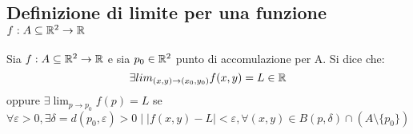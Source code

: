 \subsection{Definizione di limite per una funzione $f: A \subseteq \mathbb{R}^2 \to \mathbb{R}$}
\begin{definition}
  Sia $f: A \subseteq \mathbb{R}^2 \to \mathbb{R}$ e sia $p_0 \in \mathbb{R}^2$ punto di accomulazione per A. Si dice che:
  $$\exists lim_{(x,y)\to (x_0,y_0)} f(x,y) = L \in \mathbb{R}$$
  oppure $\exists \lim_{p \to p_0} f(p) = L$ se 
  $$\forall \varepsilon > 0, \exists \delta = d(p_0,\varepsilon) > 0 \mid 
  \lvert f(x,y)-L\rvert < \varepsilon, \forall (x,y) \in B(p,\delta) \cap (A \setminus \{p_0\})$$
\end{definition}